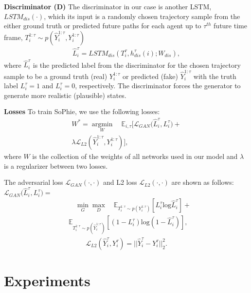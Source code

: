 \documentclass[10pt,twocolumn,letterpaper]{article}
\begin{document}
\textbf{Discriminator (D)}
The discriminator in our case is another LSTM, $LSTM_{dis}(\cdot)$, which its input is a randomly chosen trajectory sample from the either ground truth or predicted future paths for each agent up to $\tau^{th}$ future time frame, \ie $T_i^{1:\tau}\sim p(\hat{Y}_i^{1:\tau},Y_i^{1:\tau} )$ 
\begin{eqnarray}
\label{eq:dis}
\hat{L}_{i}^{\tau} = LSTM_{dis}(T_i^{\tau}, h_{dis}^{\tau}(i); W_{dis}), 
\end{eqnarray}
where $\hat{L}_{i}^{\tau}$ is the predicted label from the discriminator for the chosen trajectory sample to be a ground truth (real) $Y_i^{1:\tau}$ or predicted (fake) $\hat{Y}_i^{1:\tau}$ with the truth label $L_{i}^{\tau} = 1$ and $L_{i}^{\tau} = 0$,  respectively. The discriminator forces the generator to generate more realistic (plausible) states. 


\textbf{Losses}
To train SoPhie, we use the following losses:
\begin{eqnarray}
\label{eq:obj}
W^* =\operatorname*{argmin}_W \quad\mathbb{E}_{i,\tau}[\mathcal{L}_{GAN}\big(\hat{L}_{i}^{\tau}, L_{i}^{\tau} \big)+ \nonumber\\
\lambda \mathcal{L}_{L2}(\hat{Y}_i^{1:\tau},Y_i^{1:\tau})],
\end{eqnarray}
where $W$ is the collection of the weights of all networks used in our model and $\lambda$ is a regularizer between two losses. 

The adversarial loss $\mathcal{L}_{GAN}(\cdot,\cdot)$ and L2 loss $\mathcal{L}_{L2}(\cdot,\cdot)$ are shown as follows:\\
$\mathcal{L}_{GAN}\big(\hat{L}_{i}^{\tau}, L_{i}^{\tau} \big) = $
\begin{eqnarray}
\label{eq:loss1}
\qquad \min_{G} \max_{D}\quad \mathbb{E}_{T^{1:\tau}_i\sim p(Y^{1:\tau}_i)}[L^{\tau}_i\mbox{log} \hat{L}^{\tau}_i] +\nonumber\\\quad
\mathbb{E}_{T^{1:\tau}_i\sim p(\hat{Y}^{1:\tau}_i)}[(1-L^{\tau}_i)\mbox{log} (1 - \hat{L}^{\tau}_i)], 
\end{eqnarray}
\begin{eqnarray}
\label{eq:loss2}
\mathcal{L}_{L2}(\hat{Y}_i^{\tau},Y_i^{\tau}) = ||\hat{Y}_i^{\tau}-Y_i^{\tau}||^2_2.
\end{eqnarray}


\section{Experiments}
\label{sec:Experiments}
\end{document}
